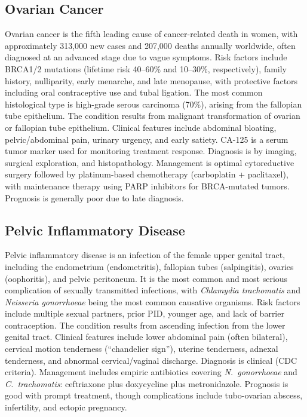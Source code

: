 \subsection{Ovarian Cancer}
\label{sec:Ovarian Cancer}
Ovarian cancer is the fifth leading cause of cancer-related death in women, with approximately 313,000 new cases and 207,000 deaths annually worldwide, often diagnosed at an advanced stage due to vague symptoms. Risk factors include BRCA1/2 mutations (lifetime risk 40--60\% and 10--30\%, respectively), family history, nulliparity, early menarche, and late menopause, with protective factors including oral contraceptive use and tubal ligation. The most common histological type is high-grade serous carcinoma (70\%), arising from the fallopian tube epithelium. The condition results from malignant transformation of ovarian or fallopian tube epithelium. Clinical features include abdominal bloating, pelvic/abdominal pain, urinary urgency, and early satiety. CA-125 is a serum tumor marker used for monitoring treatment response. Diagnosis is by imaging, surgical exploration, and histopathology. Management is optimal cytoreductive surgery followed by platinum-based chemotherapy (carboplatin + paclitaxel), with maintenance therapy using PARP inhibitors for BRCA-mutated tumors. Prognosis is generally poor due to late diagnosis.

\subsection{Pelvic Inflammatory Disease}
\label{sec:Pelvic Inflammatory Disease}
Pelvic inflammatory disease is an infection of the female upper genital tract, including the endometrium (endometritis), fallopian tubes (salpingitis), ovaries (oophoritis), and pelvic peritoneum. It is the most common and most serious complication of sexually transmitted infections, with \textit{Chlamydia trachomatis} and \textit{Neisseria gonorrhoeae} being the most common causative organisms. Risk factors include multiple sexual partners, prior PID, younger age, and lack of barrier contraception. The condition results from ascending infection from the lower genital tract. Clinical features include lower abdominal pain (often bilateral), cervical motion tenderness (``chandelier sign''), uterine tenderness, adnexal tenderness, and abnormal cervical/vaginal discharge. Diagnosis is clinical (CDC criteria). Management includes empiric antibiotics covering \textit{N.~gonorrhoeae} and \textit{C.~trachomatis}: ceftriaxone plus doxycycline plus metronidazole. Prognosis is good with prompt treatment, though complications include tubo-ovarian abscess, infertility, and ectopic pregnancy.

